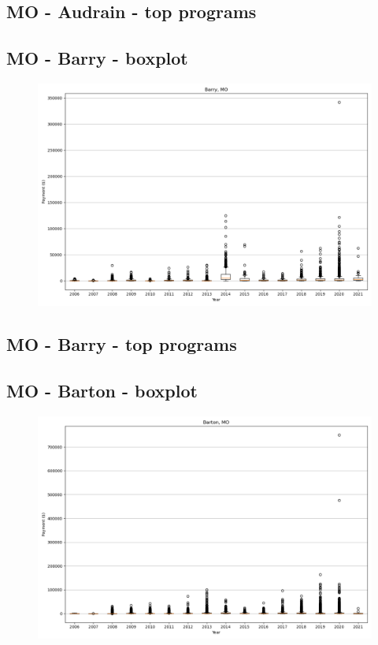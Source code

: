 \subsection*{MO - Audrain - top programs}

\newpage
\subsection*{MO - Barry - boxplot}
\begin{figure}[h]
\centering
\includegraphics[width=7in]{../output/boxplots/counties/Barry-MO_boxplot.png}
\end{figure}


\subsection*{MO - Barry - top programs}

\newpage
\subsection*{MO - Barton - boxplot}
\begin{figure}[h]
\centering
\includegraphics[width=7in]{../output/boxplots/counties/Barton-MO_boxplot.png}
\end{figure}



